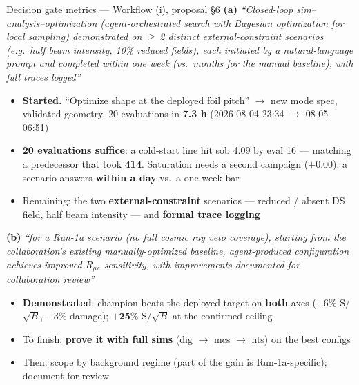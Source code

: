 \documentclass[aspectratio=169,10pt]{beamer}
\begin{document}
\begin{frame}{Decision gate metrics --- Workflow (i), proposal \S6}
\footnotesize
\scriptsize
\textbf{(a)} \emph{``Closed-loop sim--analysis--optimization (agent-orchestrated search with Bayesian
optimization for local sampling) demonstrated on $\ge$\,2 distinct external-constraint scenarios
(e.g.\ half beam intensity, 10\% reduced fields), each initiated by a natural-language prompt and
completed within one week (vs.\ months for the manual baseline), with full traces logged''}
\begin{itemize}\footnotesize
  \item[$\rightarrow$] \textbf{Started.} ``Optimize shape at the deployed foil pitch'' $\rightarrow$ new mode spec, validated geometry, 20 evaluations in \textbf{7.3 h} (2026-08-04 23:34 $\rightarrow$ 08-05 06:51)
  \item[$\rightarrow$] \textbf{20 evaluations suffice}: a cold-start line hit sob 4.09 by eval 16 --- matching a predecessor that took \textbf{414}. Saturation needs a second campaign ($+0.00$): a scenario answers \textbf{within a day} vs.\ a one-week bar
  \item[$\rightarrow$] Remaining: the two \textbf{external-constraint} scenarios --- reduced / absent DS field, half beam intensity --- and \textbf{formal trace logging}
\end{itemize}
\vspace{0.7em}

\textbf{(b)} \emph{``for a Run-1a scenario (no full cosmic ray veto coverage), starting from the
collaboration's existing manually-optimized baseline, agent-produced configuration achieves improved
$R_{\mu e}$ sensitivity, with improvements documented for collaboration review''}
\begin{itemize}\footnotesize
  \item[$\rightarrow$] \textcolor{okgreen}{\textbf{Demonstrated}}: champion beats the deployed target on \textbf{both} axes ($+6\%$ S/$\sqrt{B}$, $-3\%$ damage); $\mathbf{+25\%}$ S/$\sqrt{B}$ at the confirmed ceiling
  \item[$\rightarrow$] To finish: \textbf{prove it with full sims} (dig $\rightarrow$ mcs $\rightarrow$ nts) on the best configs
  \item[$\rightarrow$] Then: scope by background regime (part of the gain is Run-1a-specific); document for review
\end{itemize}
\end{frame}
\end{document}
